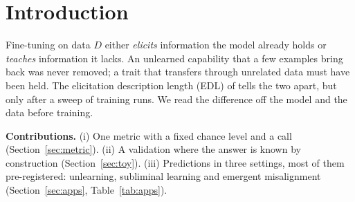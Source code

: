 \documentclass{article}
\theoremstyle{definition}
\begin{document}
\printAffiliationsAndNotice{}

\begin{abstract}
Fine-tuning either elicits information a model already holds or teaches information it lacks. The two look the
same after training and differ for safety. We give one metric, the \emph{link gap}, computed from the model and
the data before training: it asks whether a context (an item's own prompt or a trait description) makes
the data more expected than it makes a matched control. On a toy task with known ground truth it recovers the
construction of all five models. Applied before training, it shows that ten unlearned or safeguarded models still
hold the facts they were meant to lose, shows that traits absent from the data transfer subliminally only when the student holds them, and orders how much transfers,
and finds the misaligned persona in five of six models that later show emergent misalignment.
\end{abstract}

\section{Introduction}

Fine-tuning on data $D$ either \emph{elicits} information the model already holds or \emph{teaches} information it
lacks. An unlearned capability that a few examples bring back was never removed; a trait that transfers through
unrelated data must have been held. The elicitation description length (EDL) of \citet{donoway2026bits} tells the
two apart, but only after a sweep of training runs. We read the difference off the model and the data before
training.

\textbf{Contributions.} (i) One metric with a fixed chance level and a call (Section~\ref{sec:metric}). (ii) A
validation where the answer is known by construction (Section~\ref{sec:toy}). (iii) Predictions in three settings,
most of them pre-registered: unlearning, subliminal learning and emergent misalignment
(Section~\ref{sec:apps}, Table~\ref{tab:apps}).
\end{document}
